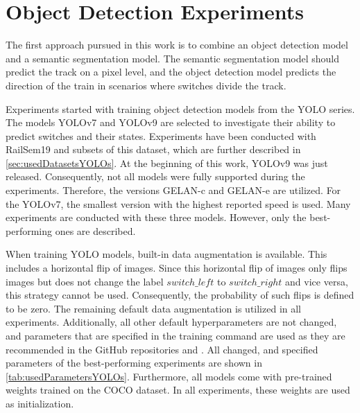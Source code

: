 \section{Object Detection Experiments}
\label{sec:objectDetectionExperiments}

The first approach pursued in this work is to combine an object detection model and a semantic segmentation model.
The semantic segmentation model should predict the track on a pixel level, and the object detection model predicts the direction of the train in scenarios where switches divide the track.

Experiments started with training object detection models from the \ac{YOLO} series.
The models \ac{YOLO}v7 \cite{yolov7} and \ac{YOLO}v9 \cite{YOLOv9} are selected to investigate their ability to predict switches and their states.
Experiments have been conducted with RailSem19 and subsets of this dataset, which are further described in \autoref{sec:usedDatasetsYOLOs}.
At the beginning of this work, \ac{YOLO}v9 was just released.
Consequently, not all models were fully supported during the experiments.
Therefore, the versions \ac{GELAN}-c and \ac{GELAN}-e are utilized.
For the \ac{YOLO}v7, the smallest version with the highest reported speed is used.
Many experiments are conducted with these three models.
However, only the best-performing ones are described.

When training \ac{YOLO} models, built-in data augmentation is available.
This includes a horizontal flip of images.
Since this horizontal flip of images only flips images but does not change the label $switch\_left$ to $switch\_right$ and vice versa, this strategy cannot be used.
Consequently, the probability of such flips is defined to be zero. The remaining default data augmentation is utilized in all experiments.
Additionally, all other default hyperparameters are not changed, and parameters that are specified in the training command are used as they are recommended in the GitHub repositories \cite{YOLOv7GitHub} and \cite{YOLOv9GitHub}.
All changed, and specified parameters of the best-performing experiments are shown in \autoref{tab:usedParametersYOLOs}.
Furthermore, all models come with pre-trained weights trained on the COCO dataset.
In all experiments, these weights are used as initialization.

